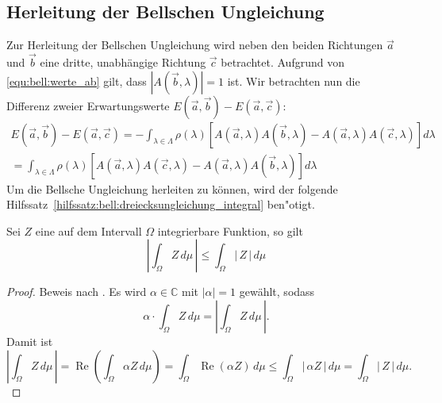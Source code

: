 \begin{refsection}
\subsection{Herleitung der Bellschen Ungleichung}
Zur Herleitung der Bellschen Ungleichung wird neben den beiden Richtungen 
$\vec{a}$ und $\vec{b}$ eine dritte, unabh\"angige Richtung $\vec{c}$ 
betrachtet. 
Aufgrund von \eqref{equ:bell:werte_ab} gilt, dass
$|A(\vec{b},\lambda)| = 1$ ist.
Wir betrachten nun die Differenz zweier Erwartungswerte
$E(\vec{a},\vec{b}) - E(\vec{a},\vec{c})$:
\begin{equation}\label{equ:bell:diff_e}
\begin{split}
    E(\vec{a},\vec{b}) - E(\vec{a},\vec{c}) =
    - \int_{\lambda\in\Lambda} \rho(\lambda) \left[ 
        A(\vec{a},\lambda) A(\vec{b},\lambda) - 
        A(\vec{a},\lambda) A(\vec{c},\lambda)
    \right] d\lambda \\
    = \int_{\lambda\in\Lambda} \rho(\lambda) \left[
         A(\vec{a},\lambda)A(\vec{c},\lambda) - 
         A(\vec{a},\lambda)A(\vec{b},\lambda)
    \right] d\lambda
\end{split}
\end{equation}
Um die Bellsche Ungleichung herleiten zu k\"onnen, wird 
der folgende Hilfssatz~\ref{hilfssatz:bell:dreiecksungleichung_integral}
ben"otigt.
\begin{hilfssatz}\label{hilfssatz:bell:dreiecksungleichung_integral}
    Sei $Z$ eine auf dem Intervall $\Omega$ integrierbare Funktion, so gilt
    \[
        \left|\int_{\Omega} Z\, d\mu\,\right| 
        \leq \int_{\Omega} |\,Z\,|\, d\mu
    \]
\end{hilfssatz}
\begin{proof}
    Beweis nach \cite{Bell:HilfssatzTriangle}.
    Es wird $\alpha\in\mathbb{C}$ mit $|\alpha| = 1$ gew\"ahlt, sodass
    \[
        \alpha \cdot \int_{\Omega} Z\, d\mu = 
        \left|\int_{\Omega} Z\, d\mu\,\right|.
    \]
    Damit ist
    \[
        \left|\int_{\Omega} Z\, d\mu\,\right| = 
        \operatorname{Re}\left( \int_{\Omega}\alpha Z \,d\mu \right) = 
        \int_{\Omega}\operatorname{Re}(\alpha Z)\,d\mu
        \leq
        \int_{\Omega} |\,\alpha Z\,|\, d\mu = 
        \int_{\Omega} |\,Z\,|\, d\mu.
    \]
\end{proof}


\end{refsection}
